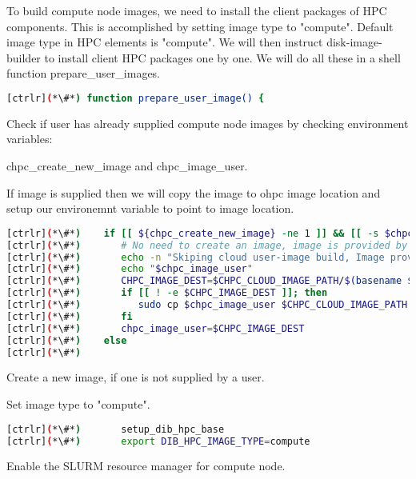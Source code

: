 	To build compute node images, we need to install the client packages of HPC components. This is accomplished by setting image type to "compute". Default image type in HPC elements is "compute". We will then instruct disk-image-builder to install client HPC packages one by one. We will do all these in a shell function prepare\_user\_images.

\begin{lstlisting}[language=bash,keywords={}]
[ctrlr](*\#*) function prepare_user_image() {

\end{lstlisting} 

	Check if user has already supplied compute node images by checking environment variables:
	
		 chpc\_create\_new\_image and chpc\_image\_user.
		  
	If image is supplied then we will copy the image to ohpc image location and setup our environemnt variable to point to image location.
\begin{lstlisting}[language=bash,keywords={}]
[ctrlr](*\#*)    if [[ ${chpc_create_new_image} -ne 1 ]] && [[ -s $chpc_image_user ]]; then
[ctrlr](*\#*)       # No need to create an image, image is provided by user
[ctrlr](*\#*)       echo -n "Skiping cloud user-image build, Image provided:"
[ctrlr](*\#*)       echo "$chpc_image_user"
[ctrlr](*\#*)       CHPC_IMAGE_DEST=$CHPC_CLOUD_IMAGE_PATH/$(basename $chpc_image_user)
[ctrlr](*\#*)       if [[ ! -e $CHPC_IMAGE_DEST ]]; then
[ctrlr](*\#*)          sudo cp $chpc_image_user $CHPC_CLOUD_IMAGE_PATH
[ctrlr](*\#*)       fi
[ctrlr](*\#*)       chpc_image_user=$CHPC_IMAGE_DEST
[ctrlr](*\#*)    else
[ctrlr](*\#*)    

\end{lstlisting} 


	Create a new image, if one is not supplied by a user. 	
	
	Set image type to "compute".

\begin{lstlisting}[language=bash,keywords={}]
[ctrlr](*\#*)       setup_dib_hpc_base
[ctrlr](*\#*)       export DIB_HPC_IMAGE_TYPE=compute
\end{lstlisting} 

	Enable the SLURM resource manager for compute node.

